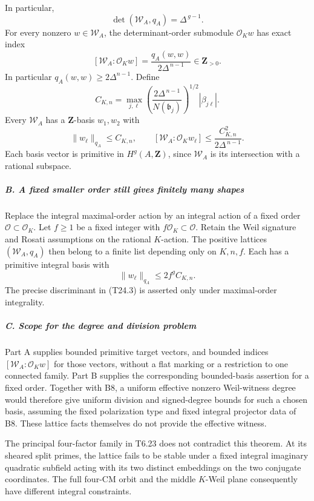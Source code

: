 \documentclass[11pt,a4paper]{article}
\theoremstyle{definition}
\begin{document}
In particular, \[
 \det(\mathscr W_A,q_A)=\Delta^{\,g-1}.
 \tag{T24.3}
\] For every nonzero \(w\in\mathscr W_A\), the determinant-order submodule \(\mathcal O_Kw\) has exact index \[
 [\mathscr W_A:\mathcal O_Kw]
       =\frac{q_A(w,w)}{2\Delta^{\,n-1}}\in\mathbf Z_{>0}.
 \tag{T24.4}
\] In particular \(q_A(w,w)\ge 2\Delta^{n-1}\). Define \[
 C_{K,n}
   =\max_{j,\ell}
       \left(\frac{2\Delta^{\,n-1}}{N(\mathfrak b_j)}\right)^{1/2}
                       |\beta_{j\ell}|.
 \tag{T24.5}
\] Every \(\mathscr W_A\) has a \(\mathbf Z\)-basis \(w_1,w_2\) with \[
 \|w_\ell\|_{q_A}\le C_{K,n},\qquad
 [\mathscr W_A:\mathcal O_Kw_\ell]
        \le \frac{C_{K,n}^2}{2\Delta^{\,n-1}}.
 \tag{T24.6}
\] Each basis vector is primitive in \(H^g(A,\mathbf Z)\), since \(\mathscr W_A\) is its intersection with a rational subspace.

\subparagraph{B. A fixed smaller order still gives finitely many shapes}\label{b.-a-fixed-smaller-order-still-gives-finitely-many-shapes}

Replace the integral maximal-order action by an integral action of a fixed order \(\mathcal O\subset\mathcal O_K\). Let \(f\ge1\) be a fixed integer with \(f\mathcal O_K\subset\mathcal O\). Retain the Weil signature and Rosati assumptions on the rational \(K\)-action. The positive lattices \((\mathscr W_A,q_A)\) then belong to a finite list depending only on \(K,n,f\). Each has a primitive integral basis with \[
 \|w_\ell\|_{q_A}\le 2f^g C_{K,n}.
 \tag{T24.7}
\] The precise discriminant in (T24.3) is asserted only under maximal-order integrality.

\subparagraph{C. Scope for the degree and division problem}\label{c.-scope-for-the-degree-and-division-problem}

Part A supplies bounded primitive target vectors, and bounded indices \([\mathscr W_A:\mathcal O_K w]\) for those vectors, without a flat marking or a restriction to one connected family. Part B supplies the corresponding bounded-basis assertion for a fixed order. Together with B8, a uniform effective nonzero Weil-witness degree would therefore give uniform division and signed-degree bounds for such a chosen basis, assuming the fixed polarization type and fixed integral projector data of B8. These lattice facts themselves do not provide the effective witness.

The principal four-factor family in T6.23 does not contradict this theorem. At its sheared split primes, the lattice fails to be stable under a fixed integral imaginary quadratic subfield acting with its two distinct embeddings on the two conjugate coordinates. The full four-CM orbit and the middle \(K\)-Weil plane consequently have different integral constraints.
\end{document}
